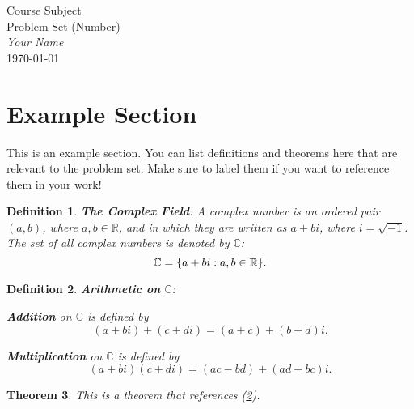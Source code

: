 \documentclass[12pt,letterpaper, onecolumn]{exam}
\newtheorem{definition}{Definition}[section] %
\newtheorem{theorem}[definition]{Theorem}    %
\begin{document}
\begin{titlepage}
    \centering
    \vspace*{2cm}
    \Huge Course Subject\\[0.5em]
    \LARGE Problem Set (Number)\\[1em]
    \Large\textit{Your Name}\\[1em]
    \Large\today
    \vfill
\end{titlepage}

\pointsdroppedatright   %
\printanswers
\renewcommand{\solutiontitle}{\noindent\textbf{Soln:}\enspace}   

\section{Example Section}

This is an example section. You can list definitions and theorems here that are relevant to the problem set. Make sure to label them if you want to reference them in your work!


\begin{definition}
    \label{def:complex_field}
    \textbf{The Complex Field}:
    A complex number is an ordered pair $(a,b)$, where $a,b\in\mathbb R$, and in which they are written as $a+bi$, where $i=\sqrt{-1}$. The set of all complex numbers is denoted by $\mathbb C$:
    \begin{equation}
        \notag
        \mathbb C=\{a+bi:a,b\in\mathbb R\}.
    \end{equation}
\end{definition}

\begin{definition}
    \label{def:complex_arithmetic}
    \textbf{Arithmetic on} $\mathbb C$:
    
    \textbf{Addition} on $\mathbb C$ is defined by
    \begin{equation}
        (a+bi)+(c+di)=(a+c)+(b+d)i.
    \end{equation}
    
    \textbf{Multiplication} on $\mathbb C$ is defined by
    \begin{equation}
        (a+bi)(c+di)=(ac-bd)+(ad+bc)i.
    \end{equation}
\end{definition}

\begin{theorem}
    This is a theorem that references (\ref{def:complex_arithmetic}).
\end{theorem}
\end{document}
